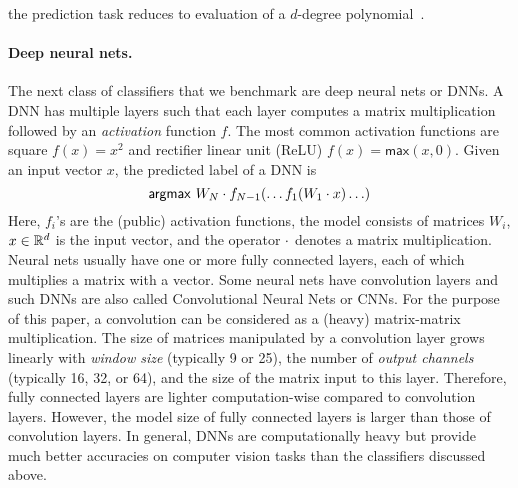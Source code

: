  the prediction task
reduces to evaluation of a $d$-degree polynomial~\cite{shafindss}.

\paragraph{Deep neural nets.}
The next class of classifiers that we benchmark are deep neural nets
or DNNs. A DNN has multiple layers such that each layer computes a
matrix
multiplication followed by an {\it activation} function $f$. The most
common activation functions are square $f(x)=x^2$ and rectifier linear
unit (ReLU) $f(x)=\mathsf{max}(x,0)$.
Given an input vector $x$, the predicted label of a DNN is
\[
 \mathsf{argmax}\ W_N\cdot f_{N-1}(\ldots f_1(W_1\cdot x)\ldots)
\]
Here, $f_i$'s are the (public) activation functions, the model
consists of matrices $W_i$,  $x \in {\mathbb{R}}^d$ is the input vector, and the
operator $\cdot$ denotes a matrix multiplication.
Neural nets usually have one or more fully connected layers, each of
which multiplies a matrix with a vector.
Some neural nets have convolution layers and such DNNs are also called
Convolutional Neural Nets or CNNs.
For the purpose of this paper, a convolution can be considered as a
(heavy) matrix-matrix multiplication. The size of matrices manipulated
by a convolution layer grows linearly with {\it window size}
(typically 9 or 25), the number of {\it output channels} (typically
16, 32, or 64), and the size of the matrix input to this layer.
Therefore, fully connected layers are lighter computation-wise compared
to convolution layers. However, the model size  of fully connected
layers is larger than those of convolution layers.
In general, DNNs are computationally heavy but provide
much better accuracies on computer vision tasks than the classifiers
discussed above.

